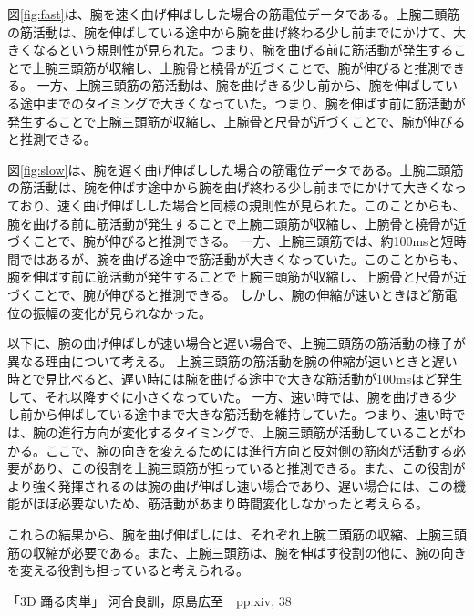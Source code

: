 \documentclass{jsarticle}
\begin{document}
図\ref{fig:fast}は、腕を速く曲げ伸ばしした場合の筋電位データである。上腕二頭筋の筋活動は、腕を伸ばしている途中から腕を曲げ終わる少し前までにかけて、大きくなるという規則性が見られた。つまり、腕を曲げる前に筋活動が発生することで上腕三頭筋が収縮し、上腕骨と橈骨が近づくことで、腕が伸びると推測できる。
一方、上腕三頭筋の筋活動は、腕を曲げきる少し前から、腕を伸ばしている途中までのタイミングで大きくなっていた。つまり、腕を伸ばす前に筋活動が発生することで上腕三頭筋が収縮し、上腕骨と尺骨が近づくことで、腕が伸びると推測できる。

図\ref{fig:slow}は、腕を遅く曲げ伸ばしした場合の筋電位データである。上腕二頭筋の筋活動は、腕を伸ばす途中から腕を曲げ終わる少し前までにかけて大きくなっており、速く曲げ伸ばしした場合と同様の規則性が見られた。このことからも、腕を曲げる前に筋活動が発生することで上腕二頭筋が収縮し、上腕骨と橈骨が近づくことで、腕が伸びると推測できる。
一方、上腕三頭筋では、約100msと短時間ではあるが、腕を曲げる途中で筋活動が大きくなっていた。このことからも、腕を伸ばす前に筋活動が発生することで上腕三頭筋が収縮し、上腕骨と尺骨が近づくことで、腕が伸びると推測できる。
しかし、腕の伸縮が速いときほど筋電位の振幅の変化が見られなかった。

以下に、腕の曲げ伸ばしが速い場合と遅い場合で、上腕三頭筋の筋活動の様子が異なる理由について考える。
上腕三頭筋の筋活動を腕の伸縮が速いときと遅い時とで見比べると、遅い時には腕を曲げる途中で大きな筋活動が100msほど発生して、それ以降すぐに小さくなっていた。
一方、速い時では、腕を曲げきる少し前から伸ばしている途中まで大きな筋活動を維持していた。つまり、速い時では、腕の進行方向が変化するタイミングで、上腕三頭筋が活動していることがわかる。ここで、腕の向きを変えるためには進行方向と反対側の筋肉が活動する必要があり、この役割を上腕三頭筋が担っていると推測できる。また、この役割がより強く発揮されるのは腕の曲げ伸ばし速い場合であり、遅い場合には、この機能がほぼ必要ないため、筋活動があまり時間変化しなかったと考えらる。　

これらの結果から、腕を曲げ伸ばしには、それぞれ上腕二頭筋の収縮、上腕三頭筋の収縮が必要である。また、上腕三頭筋は、腕を伸ばす役割の他に、腕の向きを変える役割も担っていると考えられる。

\begin{thebibliography}{9}
	 「3D 踊る肉単」 河合良訓，原島広至　pp.xiv, 38
\end{thebibliography}
\end{document}
